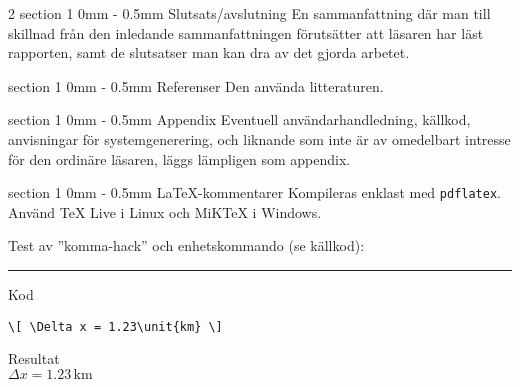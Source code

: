 \documentclass[a4paper]{article}
\makeatletter
\newcommand{\unit}[1]{\ensuremath{\,\mathrm{#1}}}
\renewcommand{\section}{\@startsection
{section}%
{1}%
{0mm}%
{-\baselineskip}%
{0.5mm}%
{\normalfont\bfseries}} %
\makeatother
\begin{document}
\begin{multicols}{2}
  \section{Slutsats/avslutning}
  En   sammanfattning  där   man  till   skillnad  från   den  inledande
  sammanfattningen förutsätter  att läsaren har läst  rapporten, samt de
  slutsatser man kan dra av det gjorda arbetet.

  \section{Referenser}
  Den använda litteraturen.

  \section{Appendix}
  Eventuell     användarhandledning,     källkod,    anvisningar     för
  systemgenerering, och liknande som inte  är av omedelbart intresse för
  den ordinäre läsaren, läggs lämpligen som appendix.

\end{multicols}

\section{\LaTeX-kommentarer}
Kompileras enklast med \texttt{pdflatex}. Använd TeX Live i Linux och
MiKTeX i Windows.

Test av ”komma-hack” och enhetskommando (se källkod):
\hrule
\begin{minipage}{0.5\linewidth}
  Kod
\begin{verbatim}
\[ \Delta x = 1.23\unit{km} \]
\end{verbatim}
\end{minipage}
\begin{minipage}{0.5\linewidth}
  Resultat\\
  $ \Delta x = 1.23\unit{km} $
\end{minipage}
\end{document}
